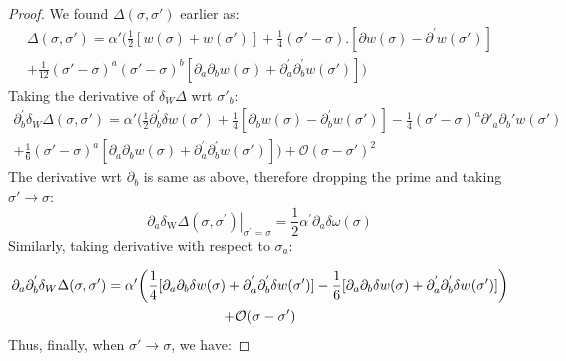 \begin{tcolorbox}[breakable]
	\begin{proof}
		We found $\Delta(\sigma,\sigma')$ earlier as:
		\begin{multline}
			\Delta (\sigma, \sigma') =\alpha'\bigg( \frac{1}{2} [w(\sigma) + w(\sigma') ] + \frac{1}{4}(\sigma'-\sigma).[\partial w(\sigma) - \partial^{'} w(\sigma')] \\+  \frac{1}{12}(\sigma'-\sigma)^a(\sigma'-\sigma)^b[\partial_a \partial_bw(\sigma)+\partial^{'}_a \partial_b^{'}w(\sigma')]\bigg)
		\end{multline}
		Taking the derivative of $\delta_W\Delta$ wrt $\sigma'_b$:
		\begin{multline}
			\partial^{'}_b \delta_W \Delta (\sigma, \sigma') =\alpha'\bigg( \frac{1}{2}\partial^{'}_b \delta w(\sigma') +  \frac{1}{4}[\partial_b w(\sigma) - \partial^{'}_b w(\sigma')]  - \frac{1}{4}(\sigma' - \sigma)^a \partial'_a \partial_b'w(\sigma')\\
			+ \frac{1}{6}(\sigma' - \sigma)^a[\partial_a \partial_bw(\sigma)+\partial^{'}_a \partial_b^{'}w(\sigma')]\bigg) + \mathcal{O}(\sigma - \sigma')^2
		\end{multline}
		The derivative wrt $\partial_b$ is same as above, therefore dropping the prime and taking $\sigma' \rightarrow \sigma$:
		\begin{equation}
				\left.\partial_{a} \delta_{\mathrm{W}} \Delta\left(\sigma, \sigma^{\prime}\right)\right|_{\sigma^{\prime}=\sigma}=\frac{1}{2} \alpha^{\prime} \partial_{a} \delta \omega(\sigma)
		\end{equation}
		Similarly, taking derivative with respect to $\sigma_a$:
		
		\begin{multline}
			\partial_a \partial^{'}_b \delta_W \Delta (\sigma, \sigma') =\alpha'\bigg( \frac{1}{4}[\partial_a \partial_b \delta w(\sigma)+ \partial^{'}_a \partial^{'}_b \delta w(\sigma')] -  \frac{1}{6}[\partial_a \partial_b \delta w(\sigma)+ \partial^{'}_a \partial^{'}_b \delta w(\sigma')]\bigg)\\
			+ \order{\sigma - \sigma'}
		\end{multline}
		Thus, finally, when $\sigma' \rightarrow \sigma$, we have: 
		

\end{proof}
\end{tcolorbox}
